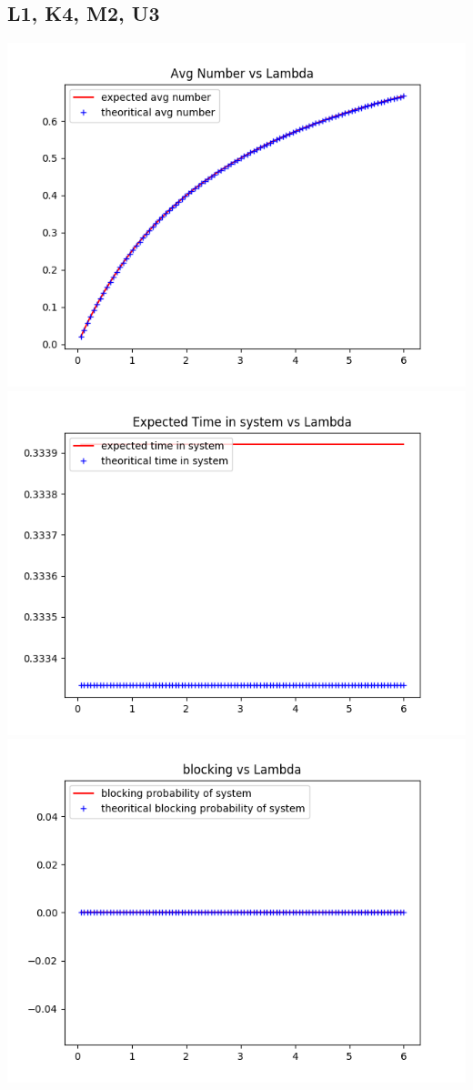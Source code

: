 \documentclass[11pt]{article}
\begin{document}
 \subsection{L1, K4, M2, U3}
 \includegraphics{ExpectedNumber_L1_K4_M2_U3}
  \includegraphics{ExpectedTime_L1_K4_M2_U3}
 \includegraphics{BlockingProbability_L1_K4_M2_U3}
\end{document}
